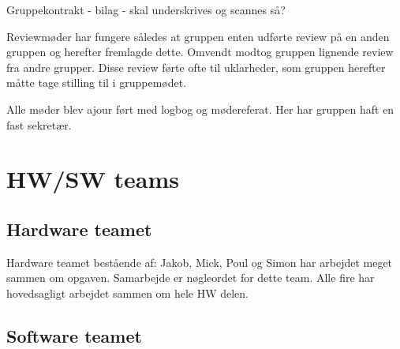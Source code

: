 Gruppekontrakt - bilag - skal underskrives og scannes så?

Reviewmøder har fungere således at gruppen enten udførte review på en anden gruppen og herefter fremlagde dette. Omvendt modtog gruppen lignende review fra andre grupper. Disse review førte ofte til uklarheder, som gruppen herefter måtte tage stilling til i gruppemødet.

Alle møder blev ajour ført med logbog og mødereferat. Her har gruppen haft en fast sekretær. 

\section{HW/SW teams}

\subsection{Hardware teamet}
Hardware teamet bestående af: Jakob, Mick, Poul og Simon har arbejdet meget sammen om opgaven. Samarbejde er nøgleordet for dette team. Alle fire har hovedsagligt arbejdet sammen om hele HW delen. 

\subsection{Software teamet}
  


